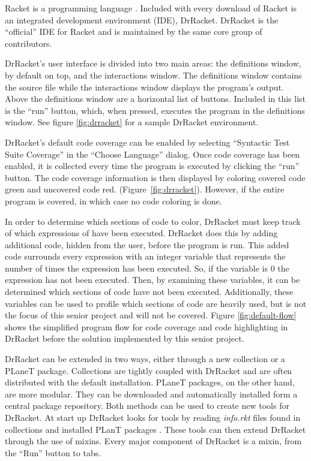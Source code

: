 Racket is a programming language \cite{racket}. Included with every download of Racket is an integrated development environment (IDE), DrRacket. DrRacket is the ``official'' IDE for Racket and is maintained by the same core group of contributors. 


DrRacket's user interface is divided into two main areas: the definitions window, by default on top, and the interactions window. The definitions window contains the source file while the interactions window displays the program's output. Above the definitions window are a horizontal list of buttons. Included in this list is the ``run'' button, which, when pressed, executes the program in the definitions window. See figure \ref{fig:drracket} for a sample DrRacket environment.

DrRacket's default code coverage can be enabled by selecting ``Syntactic Test Suite Coverage'' in the ``Choose Language'' dialog. Once code coverage has been enabled, it is collected every time the program is executed by clicking the ``run'' button. The code coverage information is then displayed by coloring covered code green and uncovered code red. (Figure~\ref{fig:drracket}). However, if the entire program is covered, in which case no code coloring is done.



In order to determine which sections of code to color, DrRacket must keep track of which expressions of have been executed. DrRacket does this by adding additional code, hidden from the user, before the program is run. This added code surrounds every expression with an integer variable that represents the number of times the expression has been executed. So, if the variable is 0 the expression has not been executed. Then, by examining these variables, it can be determined which sections of code have not been executed. Additionally, these variables can be used to profile which sections of code are heavily used, but is not the focus of this senior project and will not be covered. Figure \ref{fig:default-flow} shows the simplified program flow for code coverage and code highlighting in DrRacket before the solution implemented by this senior project.


DrRacket can be extended in two ways, either through a new collection or a PLaneT package. Collections are tightly coupled with DrRacket and are often distributed with the default installation. PLaneT packages, on the other hand, are more modular. They can be downloaded and automatically installed form a central package repository. Both methods can be used to create new tools for DrRacket. At start up DrRacket looks for tools by reading \emph{info.rkt} files found in collections and installed PLanT packages \cite{plugin}. These tools can then extend DrRacket through the use of mixins. Every major component of DrRacket is a mixin, from the ``Run'' button to tabs. 

